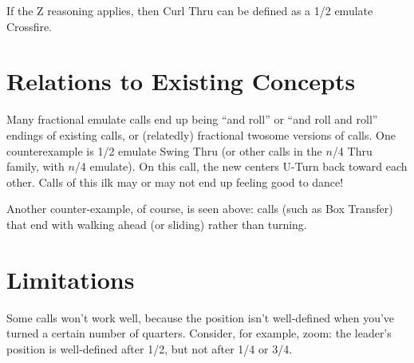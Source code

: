 \documentclass[11pt]{article}
\begin{document}

If the Z reasoning applies, then Curl Thru can be defined
as a 1/2 emulate Crossfire.

\section{Relations to Existing Concepts}

Many fractional emulate calls end up being ``and roll'' or ``and roll and
roll'' endings of existing calls,
or (relatedly) fractional twosome versions of calls.
One counterexample is 1/2 emulate Swing Thru
(or other calls in the $n$/4 Thru family, with $n$/4 emulate).
On this call, the new centers U-Turn back toward each other.
Calls of this ilk may or may not end up feeling good to dance!

Another counter-example, of course, is seen above:
calls (such as Box Transfer) that end with walking ahead
(or sliding) rather than turning.

\section{Limitations}

Some calls won't work well, because the position isn't well-defined
when you've turned a certain number of quarters.  Consider, for
example, zoom: the leader's position is well-defined after 1/2, but
not after 1/4 or 3/4.
\end{document}
